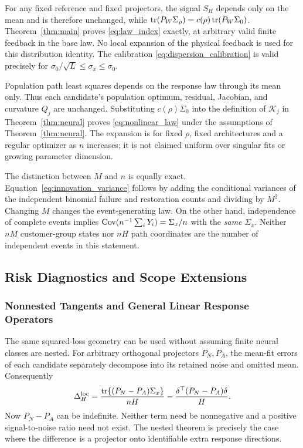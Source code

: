 For any fixed reference and fixed projectors, the signal $S_H$ depends only on the mean and is therefore unchanged, while $\operatorname{tr}(P_W\Sigma_\rho)=c(\rho)\operatorname{tr}(P_W\Sigma_0)$. Theorem~\ref{thm:main} proves \eqref{eq:law_index} exactly, at arbitrary valid finite feedback in the base law. No local expansion of the physical feedback is used for this distribution identity. The calibration \eqref{eq:dispersion_calibration} is valid precisely for $\sigma_0/\sqrt L\le\sigma_x\le\sigma_0$.

Population path least squares depends on the response law through its mean only. Thus each candidate's population optimum, residual, Jacobian, and curvature $Q_j$ are unchanged. Substituting $c(\rho)\Sigma_0$ into the definition of $\mathcal K_j$ in Theorem~\ref{thm:neural} proves \eqref{eq:nonlinear_law} under the assumptions of Theorem~\ref{thm:neural}. The expansion is for fixed $\rho$, fixed architectures and a regular optimizer as $n$ increases; it is not claimed uniform over singular fits or growing parameter dimension.

The distinction between $M$ and $n$ is equally exact. Equation~\eqref{eq:innovation_variance} follows by adding the conditional variances of the independent binomial failure and restoration counts and dividing by $M^2$. Changing $M$ changes the event-generating law. On the other hand, independence of complete events implies $\operatorname{Cov}(n^{-1}\sum_iY_i)=\Sigma_x/n$ with the \emph{same} $\Sigma_x$. Neither $nM$ customer-group states nor $nH$ path coordinates are the number of independent events in this statement.

\subsection{Risk Diagnostics and Scope Extensions}
\label{app:diagnostic}
\subsubsection{Nonnested Tangents and General Linear Response Operators}
The same squared-loss geometry can be used without assuming finite neural classes are nested. For arbitrary orthogonal projectors $P_N,P_A$, the mean-fit errors of each candidate separately decompose into its retained noise and omitted mean. Consequently
\[
 \Delta_H^{\rm loc}=
 \frac{\operatorname{tr}\{(P_N-P_A)\Sigma_x\}}{nH}
 -\frac{\delta^\top(P_N-P_A)\delta}{H}.
\]
Now $P_N-P_A$ can be indefinite. Neither term need be nonnegative and a positive signal-to-noise ratio need not exist. The nested theorem is precisely the case where the difference is a projector onto identifiable extra response directions.

